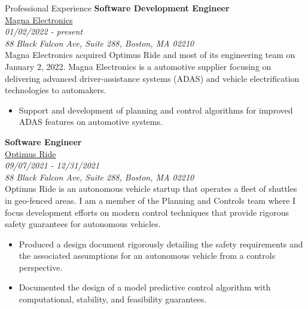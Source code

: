 \documentclass[9pt]{article}
\begin{document}
\begin{rsection}{Professional Experience}
    \textbf{Software Development Engineer} \\
     \href{https://www.magna.com/company/company-information/magna-groups/magna-electronics}{Magna Electronics} \\
    \textit{01/02/2022 - present} \\
    \textit{88 Black Falcon Ave, Suite 288, Boston, MA 02210}
    \vspace{0.5em} \\
     Magna Electronics acquired Optimus Ride and most of its engineering team on January 2, 2022. Magna Electronics is a automotive supplier focusing on delivering advanced driver-assistance systems (ADAS) and vehicle electrification technologies to automakers.
    \begin{itemize}
        \item Support and development of planning and control algorithms for improved ADAS features on automotive systems.
    \end{itemize}
    
    \textbf{Software Engineer} \\
    \href{https://www.optimusride.com/}{Optimus Ride} \\
    \textit{09/07/2021 - 12/31/2021} \\
    \textit{88 Black Falcon Ave, Suite 288, Boston, MA 02210}
    \vspace{0.5em} \\
    Optimus Ride is an autonomous vehicle startup that operates a fleet of shuttles in geo-fenced areas. I am a member of the Planning and Controls team where I focus development efforts on modern control techniques that provide rigorous safety guarantees for autonomous vehicles.
    \begin{itemize}
        \item Produced a design document rigorously detailing the safety requirements and the associated assumptions for an autonomous vehicle from a controls perspective.
        \item Documented the design of a model predictive control algorithm with computational, stability, and feasibility guarantees.
    \end{itemize}
    

\end{rsection}
\end{document}
